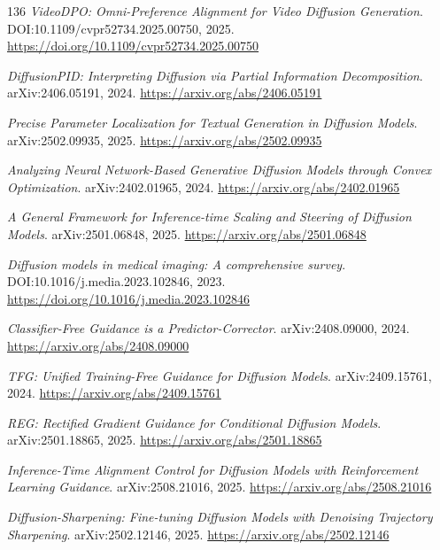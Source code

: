 \documentclass[11pt,a4paper]{article}
\begin{document}
\begin{thebibliography}{136}
\newblock \emph{VideoDPO: Omni-Preference Alignment for Video Diffusion Generation}.
\newblock DOI:10.1109/cvpr52734.2025.00750, 2025.
\newblock \url{https://doi.org/10.1109/cvpr52734.2025.00750}

\newblock \emph{DiffusionPID: Interpreting Diffusion via Partial Information Decomposition}.
\newblock arXiv:2406.05191, 2024.
\newblock \url{https://arxiv.org/abs/2406.05191}

\newblock \emph{Precise Parameter Localization for Textual Generation in Diffusion Models}.
\newblock arXiv:2502.09935, 2025.
\newblock \url{https://arxiv.org/abs/2502.09935}

\newblock \emph{Analyzing Neural Network-Based Generative Diffusion Models through Convex Optimization}.
\newblock arXiv:2402.01965, 2024.
\newblock \url{https://arxiv.org/abs/2402.01965}

\newblock \emph{A General Framework for Inference-time Scaling and Steering of Diffusion Models}.
\newblock arXiv:2501.06848, 2025.
\newblock \url{https://arxiv.org/abs/2501.06848}

\newblock \emph{Diffusion models in medical imaging: A comprehensive survey}.
\newblock DOI:10.1016/j.media.2023.102846, 2023.
\newblock \url{https://doi.org/10.1016/j.media.2023.102846}

\newblock \emph{Classifier-Free Guidance is a Predictor-Corrector}.
\newblock arXiv:2408.09000, 2024.
\newblock \url{https://arxiv.org/abs/2408.09000}

\newblock \emph{TFG: Unified Training-Free Guidance for Diffusion Models}.
\newblock arXiv:2409.15761, 2024.
\newblock \url{https://arxiv.org/abs/2409.15761}

\newblock \emph{REG: Rectified Gradient Guidance for Conditional Diffusion Models}.
\newblock arXiv:2501.18865, 2025.
\newblock \url{https://arxiv.org/abs/2501.18865}

\newblock \emph{Inference-Time Alignment Control for Diffusion Models with Reinforcement Learning Guidance}.
\newblock arXiv:2508.21016, 2025.
\newblock \url{https://arxiv.org/abs/2508.21016}

\newblock \emph{Diffusion-Sharpening: Fine-tuning Diffusion Models with Denoising Trajectory Sharpening}.
\newblock arXiv:2502.12146, 2025.
\newblock \url{https://arxiv.org/abs/2502.12146}


\end{thebibliography}
\end{document}

